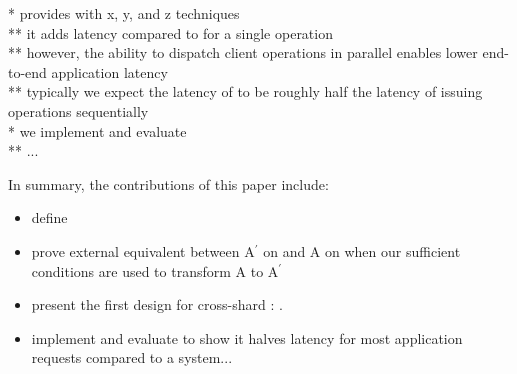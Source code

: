 * \sys{} provides \mdl{} with x, y, and z techniques\\
** it adds latency compared to \sdl{} for a single operation\\
** however, the ability to dispatch client operations in parallel enables lower end-to-end application latency\\
** typically we expect the latency of \mdl{} to be roughly half the latency of \sdl{} issuing operations sequentially\\

* we implement and evaluate \sys{}\\
** ...

In summary, the contributions of this paper include:
\begin{itemize}[leftmargin=*]
\item define \mdl{}
\item prove external equivalent between A$^\prime$ on \mdl{} and A on \sdl{} when our sufficient conditions are used to transform A to A$^\prime$
\item present the first design for cross-shard \mdl{}: \sys{}.
\item implement and evaluate \sys{} to show it halves latency for most application requests compared to a \sdl{} system...
\end{itemize}
